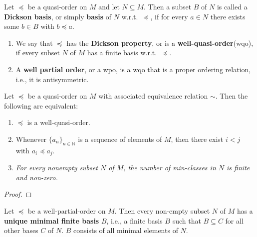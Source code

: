 \begin{definition}\label{def:wqo}
    \leanok %
    Let $\preceq$ be a quasi-order on $M$ and let $N \subseteq M$. 
    Then a subset $B$ of $N$ is called a \textbf{Dickson basis}, or simply \textbf{basis} of $N$ w.r.t.\ $\preceq$, if for every $a \in N$ there exists some $b \in B$ with $b \preceq a$.
    \begin{enumerate}
        \item We say that $\preceq$ has the \textbf{Dickson property}, or is a \textbf{well-quasi-order}(wqo), if every subset $N$ of $M$ has a finite basis w.r.t.\ $\preceq$.
        \item A \textbf{well partial order}, or a wpo, is a wqo that is a proper ordering relation, i.e., it is antisymmetric.
    \end{enumerate}
\end{definition}
    
\begin{proposition}\label{prop:wqoEquivalent} %
    \leanok %
    Let $\preceq$ be a quasi-order on $M$ with associated equivalence relation $\sim$. 
    Then the following are equivalent:
    \begin{enumerate}
        \item $\preceq$ is a well-quasi-order.
        \item Whenever $\{a_n\}_{n \in \mathbb{N}}$ is a sequence of elements of $M$, then there exist $i < j$ with $a_i \preceq a_j$.
        \item \textit{For every nonempty subset $N$ of $M$, the number of min-classes in $N$ is finite and non-zero.}
    \end{enumerate}
\end{proposition}
\begin{proof}
  \leanok %
\end{proof}
    
\begin{corollary}\label{cor:MinimalFiniteBasis} %
    Let $\preceq$ be a well-partial-order on $M$.
    Then every non-empty subset $N$ of $M$ has a \textup{\textbf{unique minimal finite basis}} $B$, i.e., a finite basis $B$ such that $B \subseteq C$ for all other bases $C$ of $N$. 
    $B$ consists of all minimal elements of $N$.
\end{corollary}
    
